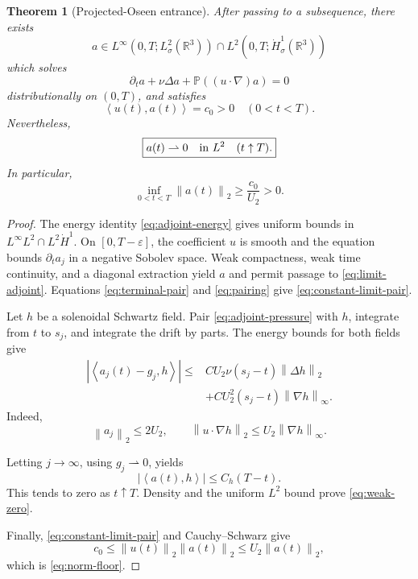 \documentclass[11pt]{article}
\newtheorem{theorem}{Theorem}
\theoremstyle{remark}
\newcommand{\R}{\mathbb R}
\newcommand{\Pj}{\mathbb P}
\newcommand{\ip}[2]{\left\langle #1,#2\right\rangle}
\newcommand{\norm}[1]{\left\|#1\right\|}
\newcommand{\weakto}{\rightharpoonup}
\begin{document}
\begin{theorem}[Projected-Oseen entrance]
\label{thm:entrance}
After passing to a subsequence, there exists
\[
 a\in
 L^\infty(0,T;L^2_\sigma(\R^3))
 \cap
 L^2(0,T;\dot H^1_\sigma(\R^3))
\]
which solves
\begin{equation}
 \label{eq:limit-adjoint}
 \partial_ta+\nu\Delta a
 +\Pj((u\cdot\nabla)a)=0
\end{equation}
distributionally on \((0,T)\), and satisfies
\begin{equation}
 \label{eq:constant-limit-pair}
 \boxed{
 \ip{u(t)}{a(t)}=c_0>0
 \quad(0<t<T).
 }
\end{equation}
Nevertheless,
\begin{equation}
 \label{eq:weak-zero}
 \boxed{
 a(t)\weakto0
 \quad\hbox{in }L^2
 \quad(t\uparrow T).
 }
\end{equation}
In particular,
\begin{equation}
 \label{eq:norm-floor}
 \boxed{
 \inf_{0<t<T}\norm{a(t)}_2
 \geq\frac{c_0}{U_2}>0.
 }
\end{equation}
\end{theorem}

\begin{proof}
The energy identity \eqref{eq:adjoint-energy} gives uniform bounds in
\(L^\infty L^2\cap L^2\dot H^1\).  On
\([0,T-\varepsilon]\), the coefficient \(u\) is smooth and the equation
bounds \(\partial_ta_j\) in a negative Sobolev space.  Weak compactness,
weak time continuity, and a diagonal extraction yield \(a\) and permit
passage to \eqref{eq:limit-adjoint}.  Equations
\eqref{eq:terminal-pair} and \eqref{eq:pairing} give
\eqref{eq:constant-limit-pair}.

Let \(h\) be a solenoidal Schwartz field.  Pair
\eqref{eq:adjoint-pressure} with \(h\), integrate from \(t\) to \(s_j\),
and integrate the drift by parts.  The energy bounds for both fields give
\begin{align}
 \label{eq:weak-trace-est}
 |\ip{a_j(t)-g_j}{h}|
 \leq{}&
 C U_2\nu(s_j-t)\norm{\Delta h}_2
 \nonumber\\
 &+
 C U_2^2(s_j-t)\norm{\nabla h}_\infty.
\end{align}
Indeed,
\[
 \norm{a_j}_2\leq2U_2,
 \qquad
 \norm{u\cdot\nabla h}_2
 \leq U_2\norm{\nabla h}_\infty.
\]

Letting \(j\to\infty\), using \(g_j\weakto0\), yields
\[
 |\ip{a(t)}{h}|
 \leq
 C_h(T-t).
\]
This tends to zero as \(t\uparrow T\).  Density and the uniform \(L^2\)
bound prove \eqref{eq:weak-zero}.

Finally, \eqref{eq:constant-limit-pair} and Cauchy--Schwarz give
\[
 c_0
 \leq
 \norm{u(t)}_2\norm{a(t)}_2
 \leq
 U_2\norm{a(t)}_2,
\]
which is \eqref{eq:norm-floor}.
\end{proof}
\end{document}
